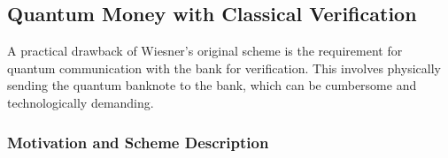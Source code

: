\documentclass{article} %
\begin{document}




\subsection{Quantum Money with Classical Verification}
A practical drawback of Wiesner's original scheme is the requirement for quantum communication with the bank for verification. This involves physically sending the quantum banknote to the bank, which can be cumbersome and technologically demanding.

\subsubsection{Motivation and Scheme Description}
\end{document}
